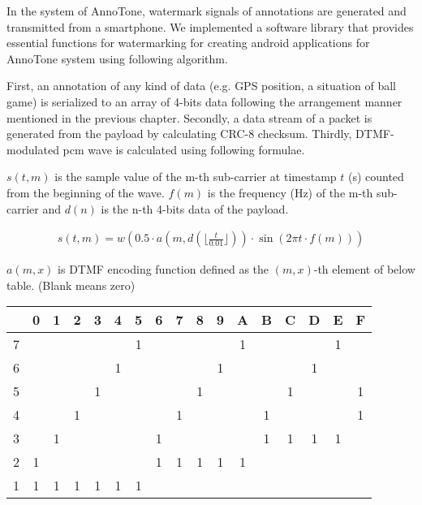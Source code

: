 In the system of AnnoTone, watermark signals of annotations are generated and transmitted from a smartphone.
We implemented a software library that provides essential functions for watermarking for creating android applications for AnnoTone system using following algorithm.

First, an annotation of any kind of data (e.g. GPS position, a situation of ball game) is serialized to an array of 4-bits data following the arrangement manner mentioned in the previous chapter.
Secondly, a data stream of a packet is generated from the payload by calculating CRC-8 checksum.
Thirdly, DTMF-modulated pcm wave is calculated using following formulae.

$s(t, m)$ is the sample value of the m-th sub-carrier at timestamp $t$ (s) counted from the beginning of the wave. $f(m)$ is the frequency (Hz) of the m-th sub-carrier and $d(n)$ is the n-th 4-bits data of the payload.

\begin{align}
s(t, m) = w( 0.5 \cdot a(m, d(\lfloor \frac{t}{0.01} \rfloor)) \cdot \sin{(2 \pi t \cdot f(m))} )
\end{align}

$a(m, x)$ is DTMF encoding function defined as the $(m, x)$-th element of below table.
(Blank means zero)

\begin{table}[ht]
\begin{center}
	\begin{tabular}{|c||c|c|c|c|c|c|c|c|c|c|c|c|c|c|c|c|} \hline
		  & 0 & 1 & 2 & 3 & 4 & 5 & 6 & 7 & 8 & 9 & A & B & C & D & E & F \\ \hline \hline
		7 &   &   &   &   &   & 1 &   &   &   &   & 1 &   &   &   & 1 &   \\ \hline
		6 &   &   &   &   & 1 &   &   &   &   & 1 &   &   &   & 1 &   &   \\ \hline
		5 &   &   &   & 1 &   &   &   &   & 1 &   &   &   & 1 &   &   & 1 \\ \hline
		4 &   &   & 1 &   &   &   &   & 1 &   &   &   & 1 &   &   &   & 1 \\ \hline
		3 &   & 1 &   &   &   &   & 1 &   &   &   &   & 1 & 1 & 1 & 1 &   \\ \hline
		2 & 1 &   &   &   &   &   & 1 & 1 & 1 & 1 & 1 &   &   &   &   &   \\ \hline
		1 & 1 & 1 & 1 & 1 & 1 & 1 &   &   &   &   &   &   &   &   &   &   \\ \hline
	\end{tabular}
\end{center}
\end{table}

